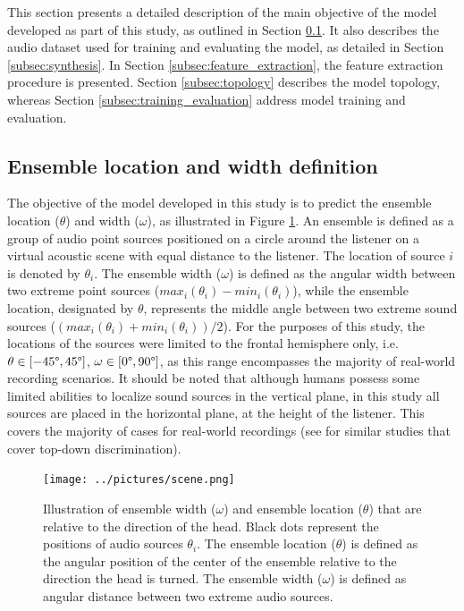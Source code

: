 \documentclass{article}
\begin{document}
This section presents a detailed description of the main objective of the model developed as part of this study, as outlined in Section \ref{subsec:ensemble_definition}. It also describes the audio dataset used for training and evaluating the model, as detailed in Section \ref{subsec:synthesis}. In Section \ref{subsec:feature_extraction}, the feature extraction procedure is presented. Section \ref{subsec:topology} describes the model topology, whereas Section \ref{subsec:training_evaluation} address model training and evaluation.

\subsection{Ensemble location and width definition}
\label{subsec:ensemble_definition}

The objective of the model developed in this study is to predict the ensemble location ($\theta$) and width ($\omega$), as illustrated in Figure \ref{fig:scene}. An ensemble is defined as a group of audio point sources positioned on a circle around the listener on a virtual acoustic scene with equal distance to the listener. The location of source $i$ is denoted by $\theta_i$. The ensemble width ($\omega$) is defined as the angular width between two extreme point sources ($max_i(\theta_i)-min_i(\theta_i)$), while the ensemble location, designated by $\theta$, represents the middle angle between two extreme sound sources ($(max_i(\theta_i)+min_i(\theta_i))/2$). For the purposes of this study, the locations of the sources were limited to the frontal hemisphere only, i.e. $\theta\in[-45\degree, 45\degree]$, $\omega\in[0\degree, 90\degree]$, as this range encompasses the majority of real-world recording scenarios. It should be noted that although humans possess some limited abilities to localize sound sources in the vertical plane, in this study all sources are placed in the horizontal plane, at the height of the listener. This covers the majority of cases for real-world recordings (see \cite{ma_robust_2018, zielinski_spatial_2022} for similar studies that cover top-down discrimination).

\begin{figure}[ht]
  \centering
  \texttt{[image: ../pictures/scene.png]}
  \caption{\label{fig:scene}Illustration of ensemble width ($\omega$) and ensemble location ($\theta$) that are relative to the direction of the head. Black dots represent the positions of audio sources $\theta_i$. The ensemble location ($\theta$) is defined as the angular position of the center of the ensemble relative to the direction the head is turned. The ensemble width ($\omega$) is defined as angular distance between two extreme audio sources. }
\end{figure}
\end{document}
